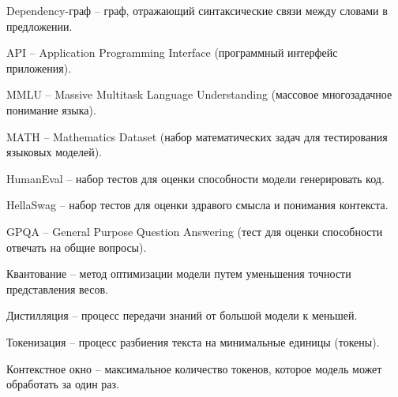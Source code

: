 \begin{enumdescript}
	\item[Dependency-граф] -- граф, отражающий синтаксические связи между словами в предложении.
	
	\item[API] -- Application Programming Interface (программный интерфейс приложения).
	
	\item[MMLU] -- Massive Multitask Language Understanding (массовое многозадачное понимание языка).
	
	\item[MATH] -- Mathematics Dataset (набор математических задач для тестирования языковых моделей).
	
	\item[HumanEval] -- набор тестов для оценки способности модели генерировать код.
	
	\item[HellaSwag] -- набор тестов для оценки здравого смысла и понимания контекста.
	
	\item[GPQA] -- General Purpose Question Answering (тест для оценки способности отвечать на общие вопросы).
	
	\item[Квантование] -- метод оптимизации модели путем уменьшения точности представления весов.
	
	\item[Дистилляция] -- процесс передачи знаний от большой модели к меньшей.
	
	\item[Токенизация] -- процесс разбиения текста на минимальные единицы (токены).
	
	\item[Контекстное окно] -- максимальное количество токенов, которое модель может обработать за один раз.
\end{enumdescript}